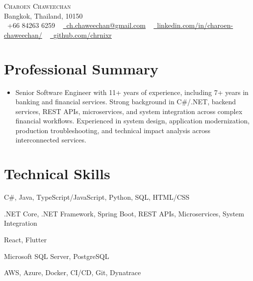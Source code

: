 \documentclass[letterpaper,11pt]{article}
\newcommand{\resumeItem}[1]{
  \item\small{
    {#1 \vspace{2pt}}
  }
}
\newcommand{\resumeSubHeadingListStart}{\begin{itemize}[topsep=0pt, parsep=0pt, itemsep=0pt, leftmargin=0.0in, label={}]}
\newcommand{\resumeSubHeadingListEnd}{\end{itemize}}
\begin{document}
\begin{center}
    {\Huge \scshape Charoen Chaweechan} \\ \vspace{1pt}
    Bangkok, Thailand, 10150 \\ \vspace{1pt}
    \small \raisebox{-0.1\height}\faPhone\ +66 84263 6259 ~ \href{mailto:ch.chaweechan@gmail.com}{\raisebox{-0.2\height}\faEnvelope\  \underline{ch.chaweechan@gmail.com}} ~ 
    \href{https://linkedin.com/in/charoen-chaweechan/}{\raisebox{-0.2\height}\faLinkedin\ \underline{linkedin.com/in/charoen-chaweechan/}}  ~
    \href{https://github.com/chrnixr}{\raisebox{-0.2\height}\faGithub\ \underline{github.com/chrnixr}}
    \vspace{2pt}
\end{center}

\section{Professional Summary}
  \resumeSubHeadingListStart
    \resumeItem{Senior Software Engineer with 11+ years of experience, including 7+ years in banking and financial services. Strong background in C#/.NET, backend services, REST APIs, microservices, and system integration across complex financial workflows. Experienced in system design, application modernization, production troubleshooting, and technical impact analysis across interconnected services.}
  \resumeSubHeadingListEnd


\section{Technical Skills}
\begin{description}[leftmargin=1.9in, labelsep=0.4em, itemsep=3pt, topsep=0pt, parsep=0pt, font=\normalfont\bfseries]
  \small
  \item[Languages:] C\#, Java, TypeScript/JavaScript, Python, SQL, HTML/CSS
  \item[Backend \& Architecture:] .NET Core, .NET Framework, Spring Boot, REST APIs, Microservices, System Integration
  \item[Frontend \& Mobile:] React, Flutter
  \item[Data:] Microsoft SQL Server, PostgreSQL
  \item[Cloud \& DevOps:] AWS, Azure, Docker, CI/CD, Git, Dynatrace
\end{description}
\end{document}
